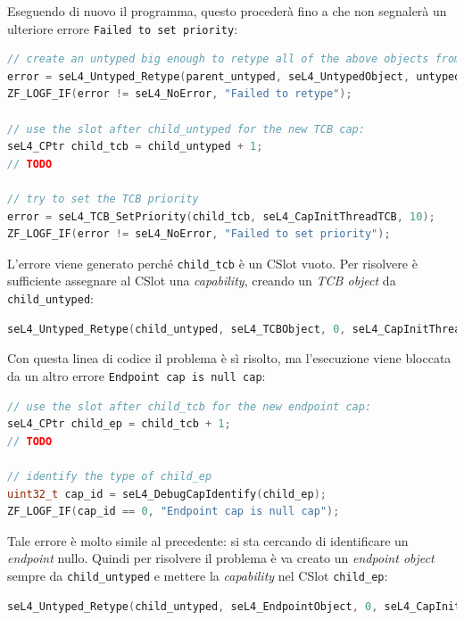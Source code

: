 Eseguendo di nuovo il programma, questo procederà fino a che non segnalerà un ulteriore errore \texttt{Failed to set priority}:
\begin{lstlisting}[language=C++]
// create an untyped big enough to retype all of the above objects from
error = seL4_Untyped_Retype(parent_untyped, seL4_UntypedObject, untyped_size_bits, seL4_CapInitThreadCNode, 0, 0, child_untyped, 1);
ZF_LOGF_IF(error != seL4_NoError, "Failed to retype");

// use the slot after child_untyped for the new TCB cap:
seL4_CPtr child_tcb = child_untyped + 1;
// TODO

// try to set the TCB priority
error = seL4_TCB_SetPriority(child_tcb, seL4_CapInitThreadTCB, 10);
ZF_LOGF_IF(error != seL4_NoError, "Failed to set priority");
\end{lstlisting}

L'errore viene generato perché \texttt{child\_tcb} è un CSlot vuoto. Per risolvere è sufficiente assegnare al CSlot una \textit{capability}, creando un \textit{TCB object} da \texttt{child\_untyped}:
\begin{lstlisting}[language=C++]
seL4_Untyped_Retype(child_untyped, seL4_TCBObject, 0, seL4_CapInitThreadCNode, 0, 0, child_tcb, 1);
\end{lstlisting}

Con questa linea di codice il problema è sì risolto, ma l'esecuzione viene bloccata da un altro errore \texttt{Endpoint cap is null cap}:
\begin{lstlisting}[language=C++]
// use the slot after child_tcb for the new endpoint cap:
seL4_CPtr child_ep = child_tcb + 1;
// TODO

// identify the type of child_ep
uint32_t cap_id = seL4_DebugCapIdentify(child_ep);
ZF_LOGF_IF(cap_id == 0, "Endpoint cap is null cap");
\end{lstlisting}

Tale errore è molto simile al precedente: si sta cercando di identificare un \textit{endpoint} nullo. Quindi per risolvere il problema è va creato un \textit{endpoint object} sempre da \texttt{child\_untyped} e mettere la \textit{capability} nel CSlot \texttt{child\_ep}:
\begin{lstlisting}[language=C++]
seL4_Untyped_Retype(child_untyped, seL4_EndpointObject, 0, seL4_CapInitThreadCNode, 0, 0, child_ep, 1);
\end{lstlisting}

